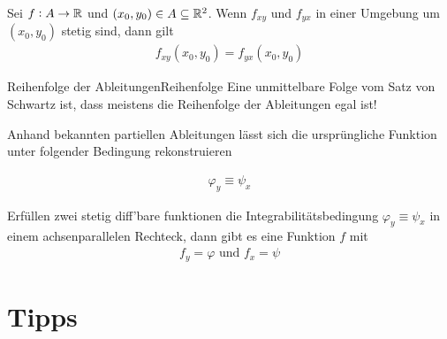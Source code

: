 \documentclass[12pt]{article}
\begin{document}
\begin{thmb}{\emph{}}
        Sei $f:A\to\mathbb{R}$ und $(x_0,y_0)\in A\subseteq\mathbb{R}^2$. Wenn $f_{xy}$ und $f_{yx}$ in einer Umgebung um $(x_0,y_0)$ stetig sind, dann gilt
        \begin{align}
                f_{xy}(x_0,y_0)=f_{yx}(x_0,y_0)
        \end{align}
\end{thmb}

\begin{rmk}{Reihenfolge der Ableitungen}{Reihenfolge}
        Eine unmittelbare Folge vom Satz von Schwartz ist, dass meistens die Reihenfolge der Ableitungen egal ist!
\end{rmk}

\begin{figure}[htbp!]
        \centering
\end{figure}

Anhand bekannten partiellen Ableitungen lässt sich die ursprüngliche Funktion
unter folgender Bedingung rekonstruieren

\begin{thmb}{\emph{}}
        \begin{align}
                \varphi_y\equiv\psi_x
        \end{align}
\end{thmb}\vspace*{1em}

\begin{fct}
        Erfüllen zwei stetig diff'bare funktionen die Integrabilitätsbedingung $\varphi_y\equiv\psi_x$ in einem achsenparallelen Rechteck, dann gibt es eine Funktion $f$ mit
        \begin{align}
                f_y=\varphi\text{ und }f_x=\psi
        \end{align}
\end{fct}

\section{Tipps}
\end{document}
